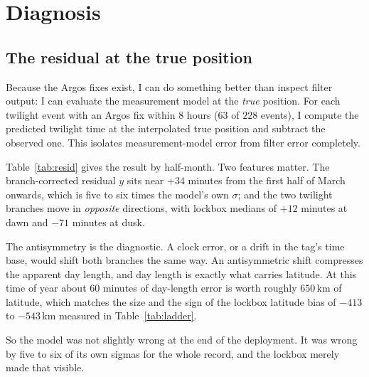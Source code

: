 \documentclass[conference]{IEEEtran}
\begin{document}
\section{Diagnosis}
\subsection{The residual at the true position}
Because the Argos fixes exist, I can do something better than inspect filter
output: I can evaluate the measurement model at the \emph{true} position. For
each twilight event with an Argos fix within $8$ hours ($63$ of $228$ events), I
compute the predicted twilight time at the interpolated true position and
subtract the observed one. This isolates measurement-model error from filter
error completely.

Table~\ref{tab:resid} gives the result by half-month. Two features matter. The
branch-corrected residual $y$ sits near $+34$ minutes from the first half of
March onwards, which is five to six times the model's own $\sigma$; and the two
twilight branches move in \emph{opposite} directions, with lockbox medians of
$+12$ minutes at dawn and $-71$ minutes at dusk.

The antisymmetry is the diagnostic. A clock error, or a drift in the tag's time
base, would shift both branches the same way. An antisymmetric shift compresses
the apparent day length, and day length is exactly what carries latitude. At
this time of year about $60$ minutes of day-length error is worth roughly
$650$\,\si{\km} of latitude, which matches the size and the sign of the lockbox
latitude bias of $-413$ to $-543$\,\si{\km} measured in Table~\ref{tab:ladder}.

So the model was not slightly wrong at the end of the deployment. It was wrong
by five to six of its own sigmas for the whole record, and the lockbox merely
made that visible.
\end{document}
